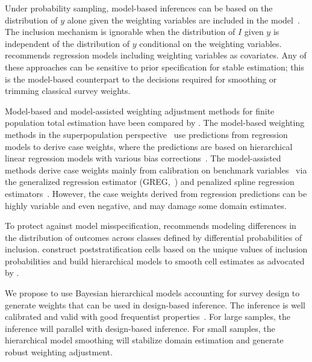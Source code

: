 \documentclass[11pt]{article}
\numberwithin{figure}{section}
\numberwithin{table}{section}
\numberwithin{equation}{section}
\begin{document}
Under probability sampling, model-based inferences can be based on the
distribution of $y$ alone given the weighting variables are included in the
model~\citep{rubin76,rubin83-pi}. The inclusion mechanism is ignorable when the
distribution of $I$ given $y$ is independent of the distribution of $y$
conditional on the weighting variables. \cite{gelman07} recommends regression
models including weighting variables as covariates. Any of these approaches can
be sensitive to prior specification for stable estimation; this is the
model-based counterpart to the decisions required for smoothing or trimming
classical survey weights.

Model-based and model-assisted weighting adjustment methods for finite
population total estimation have been compared by  \cite{henry:valliant12}. The
model-based weighting methods in the superpopulation
perspective~\citep{FPSi:Valliant00} use predictions from regression models to
derive case weights, where the predictions are based on hierarchical linear
regression models with various bias
corrections~\citep{robustblup:Chambers:JASA93,robust:Firth:JRSSB98}. The
model-assisted methods derive case weights mainly from calibration on benchmark
variables~\citep{calibration:kott09} via the generalized regression estimator
(GREG,~\cite{greg92}) and penalized spline regression
estimators~\citep{breidt05}. However, the case weights derived from regression
predictions can be highly variable and even negative, and may damage some
domain estimates.

To protect against model misspecification, \cite{little83-pi} recommends
modeling differences in the distribution of outcomes across classes defined by
differential probabilities of inclusion. \cite{bnfp:ba15} construct
poststratification cells based on the unique values of inclusion probabilities
and build hierarchical models to smooth cell estimates as advocated by
\cite{little91, little93}. 

We propose to use Bayesian hierarchical models accounting for survey design to
generate weights that can be used in design-based inference. The inference is
well calibrated and valid with good frequentist
properties~\citep{CalibratedBayes:Little11}. For large samples, the inference
will parallel with design-based inference. For small samples, the hierarchical
model smoothing will stabilize domain estimation and generate robust weighting
adjustment.
\end{document}
